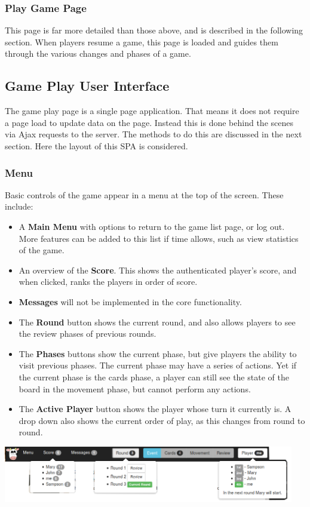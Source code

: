 \subsubsection{Play Game Page}
This page is far more detailed than those above, and is described in the following section. When players resume a game, this page is loaded and guides them through the various changes and phases of a game.


\subsection{Game Play User Interface}
The game play page is a single page application. That means it does not require a page load to update data on the page. Instead this is done behind the scenes via Ajax requests to the server. The methods to do this are discussed in the next section. Here the layout of this SPA is considered.

\subsubsection{Menu}
Basic controls of the game appear in a menu at the top of the screen. These include:
\begin{itemize}
	\item A \textbf{Main Menu} with options to return to the game list page, or log out. More features can be added to this list if time allows, such as view statistics of the game.
	\item An overview of the \textbf{Score}. This shows the authenticated player's score, and when clicked, ranks the players in order of score.
	\item \textbf{Messages} will not be implemented in the core functionality.
	\item The \textbf{Round} button shows the current round, and also allows players to see the review phases of previous rounds.
	\item The \textbf{Phases} buttons show the current phase, but give players the ability to visit previous phases. The current phase may have a series of actions. Yet if the current phase is the cards phase, a player can still see the state of the board in the movement phase, but cannot perform any actions.
	\item The \textbf{Active Player} button shows the player whose turn it currently is. A drop down also shows the current order of play, as this changes from round to round.
\end{itemize}
\begin{center}
	\includegraphics[width=5in]{Images/app3/ui-menu}
\end{center}

